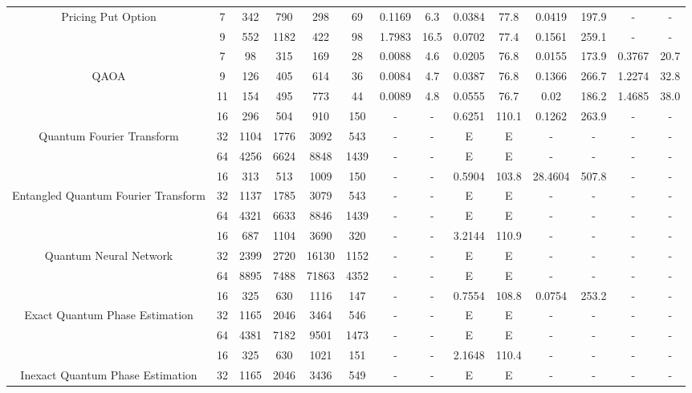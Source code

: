 \begin{table}[htb]
{\begin{tabular}{|c|c|c|c|c|c|c|c|c|c|c|c|c|c|}
 \\
Pricing Put Option & 
7 & 342 & 790 & 298 & 69
 & 0.1169 & 6.3
 & 0.0384 & 77.8
 & 0.0419 & 197.9
 & - & -
 \\
 & 
9 & 552 & 1182 & 422 & 98
 & 1.7983 & 16.5
 & 0.0702 & 77.4
 & 0.1561 & 259.1
 & - & -
 \\
\hline
 & 
7 & 98 & 315 & 169 & 28
 & 0.0088 & 4.6
 & 0.0205 & 76.8
 & 0.0155 & 173.9
 & 0.3767 & 20.7
 \\
QAOA & 
9 & 126 & 405 & 614 & 36
 & 0.0084 & 4.7
 & 0.0387 & 76.8
 & 0.1366 & 266.7
 & 1.2274 & 32.8
 \\
 & 
11 & 154 & 495 & 773 & 44
 & 0.0089 & 4.8
 & 0.0555 & 76.7
 & 0.02 & 186.2
 & 1.4685 & 38.0
 \\
\hline
 & 
16 & 296 & 504 & 910 & 150
 & - & -
 & 0.6251 & 110.1
 & 0.1262 & 263.9
 & - & -
 \\
Quantum Fourier Transform & 
32 & 1104 & 1776 & 3092 & 543
 & - & -
 & E & E
 & - & -
 & - & -
 \\
 & 
64 & 4256 & 6624 & 8848 & 1439
 & - & -
 & E & E
 & - & -
 & - & -
 \\
\hline
 & 
16 & 313 & 513 & 1009 & 150
 & - & -
 & 0.5904 & 103.8
 & 28.4604 & 507.8
 & - & -
 \\
Entangled Quantum Fourier Transform & 
32 & 1137 & 1785 & 3079 & 543
 & - & -
 & E & E
 & - & -
 & - & -
 \\
 & 
64 & 4321 & 6633 & 8846 & 1439
 & - & -
 & E & E
 & - & -
 & - & -
 \\
\hline
 & 
16 & 687 & 1104 & 3690 & 320
 & - & -
 & 3.2144 & 110.9
 & - & -
 & - & -
 \\
Quantum Neural Network & 
32 & 2399 & 2720 & 16130 & 1152
 & - & -
 & E & E
 & - & -
 & - & -
 \\
 & 
64 & 8895 & 7488 & 71863 & 4352
 & - & -
 & E & E
 & - & -
 & - & -
 \\
\hline
 & 
16 & 325 & 630 & 1116 & 147
 & - & -
 & 0.7554 & 108.8
 & 0.0754 & 253.2
 & - & -
 \\
Exact Quantum Phase Estimation & 
32 & 1165 & 2046 & 3464 & 546
 & - & -
 & E & E
 & - & -
 & - & -
 \\
 & 
64 & 4381 & 7182 & 9501 & 1473
 & - & -
 & E & E
 & - & -
 & - & -
 \\
\hline
 & 
16 & 325 & 630 & 1021 & 151
 & - & -
 & 2.1648 & 110.4
 & - & -
 & - & -
 \\
Inexact Quantum Phase Estimation & 
32 & 1165 & 2046 & 3436 & 549
 & - & -
 & E & E
 & - & -
 & - & -
 \\

\end{tabular}}
\end{table}
